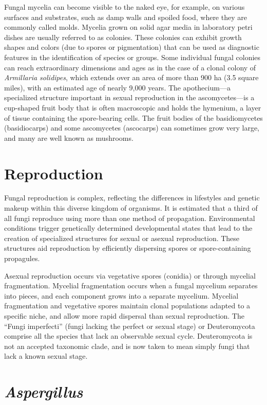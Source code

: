 Fungal mycelia can become visible to the naked eye, for example, on
various surfaces and substrates, such as damp walls and spoiled food,
where they are commonly called molds. Mycelia grown on solid agar media
in laboratory petri dishes are usually referred to as colonies. These
colonies can exhibit growth shapes and colors (due to spores or
pigmentation) that can be used as diagnostic features in the
identification of species or groups. Some individual fungal colonies can
reach extraordinary dimensions and ages as in the case of a clonal
colony of \emph{Armillaria solidipes}, which extends over an area of more than
900 ha (3.5 square miles), with an estimated age of nearly 9,000 years.
The apothecium---a specialized structure important in sexual
reproduction in the ascomycetes---is a cup-shaped fruit body that is
often macroscopic and holds the hymenium, a layer of tissue containing
the spore-bearing cells. The fruit bodies of the basidiomycetes
(basidiocarps) and some ascomycetes (ascocarps) can sometimes grow very
large, and many are well known as mushrooms.

\section{Reproduction}\label{reproduction}

Fungal reproduction is complex, reflecting the differences in lifestyles
and genetic makeup within this diverse kingdom of organisms. It is
estimated that a third of all fungi reproduce using more than one method
of propagation. Environmental conditions trigger genetically determined
developmental states that lead to the creation of specialized structures
for sexual or asexual reproduction. These structures aid reproduction by
efficiently dispersing spores or spore-containing propagules.

Asexual reproduction occurs via vegetative spores (conidia) or through
mycelial fragmentation. Mycelial fragmentation occurs when a fungal
mycelium separates into pieces, and each component grows into a separate
mycelium. Mycelial fragmentation and vegetative spores maintain clonal
populations adapted to a specific niche, and allow more rapid dispersal
than sexual reproduction. The ``Fungi imperfecti'' (fungi lacking the
perfect or sexual stage) or Deuteromycota comprise all the species that
lack an observable sexual cycle. Deuteromycota is not an accepted
taxonomic clade, and is now taken to mean simply fungi that lack a known
sexual stage.

\section{\texorpdfstring{\emph{Aspergillus}}{Aspergillus}}\label{aspergillus}

